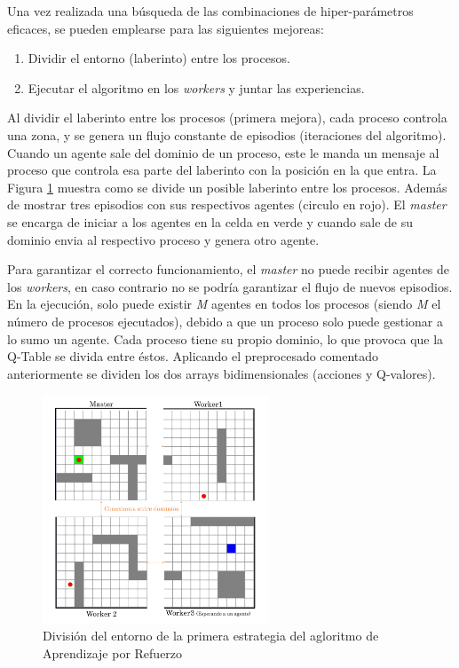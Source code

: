 		

		Una vez realizada una búsqueda de las combinaciones de hiper-parámetros eficaces, se pueden emplearse para las siguientes mejoreas:
		
		\begin{enumerate}
			\item Dividir el entorno (laberinto) entre los procesos.
			\item Ejecutar el algoritmo en los \textit{workers} y juntar las experiencias.
		\end{enumerate}

	
		
		Al dividir el laberinto entre los procesos (primera mejora), cada proceso controla una zona, y se genera un flujo constante de episodios (iteraciones del algoritmo). Cuando un agente sale del dominio de un proceso, este le manda un mensaje al proceso que controla esa parte del laberinto con la posición en la que entra. La Figura \ref{fig:rlmpi} muestra como se divide un posible laberinto entre los procesos. Además de mostrar tres episodios con sus respectivos agentes (circulo en rojo). El \textit{master} se encarga de iniciar a los agentes en la celda en verde y cuando sale de su dominio envia al respectivo proceso y genera otro agente. 
		
		Para garantizar el correcto funcionamiento, el \textit{master} no puede recibir agentes de los \textit{workers}, en caso contrario no se podría garantizar el flujo de nuevos episodios. En la ejecución, solo puede existir \textit{M} agentes en todos los procesos (siendo \textit{M} el número de procesos ejecutados), debido a que un proceso solo puede gestionar a lo sumo un agente. Cada proceso tiene su propio dominio, lo que provoca que la Q-Table se divida entre éstos. Aplicando el preprocesado comentado anteriormente se dividen los dos arrays bidimensionales (acciones y Q-valores). 
		
		
		
		\begin{figure}[!h]
			\centering
			\includegraphics[width=0.6\textwidth]{images/chapter_3/rl_mpi}	
			\caption{División del entorno de la primera estrategia del agloritmo de Aprendizaje por Refuerzo}
			\label{fig:rlmpi}
		\end{figure}
	
